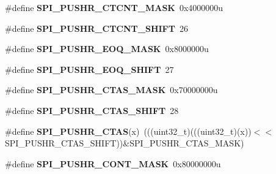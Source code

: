 \begin{DoxyCompactItemize}
\item 
\#define {\bfseries S\+P\+I\+\_\+\+P\+U\+S\+H\+R\+\_\+\+C\+T\+C\+N\+T\+\_\+\+M\+A\+SK}~0x4000000u\hypertarget{group__SPI__Register__Masks_gad9e8859d590a59f5e208f5f4a2c8b873}{}\label{group__SPI__Register__Masks_gad9e8859d590a59f5e208f5f4a2c8b873}

\item 
\#define {\bfseries S\+P\+I\+\_\+\+P\+U\+S\+H\+R\+\_\+\+C\+T\+C\+N\+T\+\_\+\+S\+H\+I\+FT}~26\hypertarget{group__SPI__Register__Masks_ga7db8f0d7ae83f27f34eafd5e4d993ed1}{}\label{group__SPI__Register__Masks_ga7db8f0d7ae83f27f34eafd5e4d993ed1}

\item 
\#define {\bfseries S\+P\+I\+\_\+\+P\+U\+S\+H\+R\+\_\+\+E\+O\+Q\+\_\+\+M\+A\+SK}~0x8000000u\hypertarget{group__SPI__Register__Masks_ga997edfebb20bfe6a385f018eb9a8a8fb}{}\label{group__SPI__Register__Masks_ga997edfebb20bfe6a385f018eb9a8a8fb}

\item 
\#define {\bfseries S\+P\+I\+\_\+\+P\+U\+S\+H\+R\+\_\+\+E\+O\+Q\+\_\+\+S\+H\+I\+FT}~27\hypertarget{group__SPI__Register__Masks_ga81e193cbd4602af43cd59a35e56fa958}{}\label{group__SPI__Register__Masks_ga81e193cbd4602af43cd59a35e56fa958}

\item 
\#define {\bfseries S\+P\+I\+\_\+\+P\+U\+S\+H\+R\+\_\+\+C\+T\+A\+S\+\_\+\+M\+A\+SK}~0x70000000u\hypertarget{group__SPI__Register__Masks_ga3ac8018fdfe57c16da2782e99232ae45}{}\label{group__SPI__Register__Masks_ga3ac8018fdfe57c16da2782e99232ae45}

\item 
\#define {\bfseries S\+P\+I\+\_\+\+P\+U\+S\+H\+R\+\_\+\+C\+T\+A\+S\+\_\+\+S\+H\+I\+FT}~28\hypertarget{group__SPI__Register__Masks_ga16a0810e65793ba9f24a5ae8be8cf49a}{}\label{group__SPI__Register__Masks_ga16a0810e65793ba9f24a5ae8be8cf49a}

\item 
\#define {\bfseries S\+P\+I\+\_\+\+P\+U\+S\+H\+R\+\_\+\+C\+T\+AS}(x)~(((uint32\+\_\+t)(((uint32\+\_\+t)(x))$<$$<$S\+P\+I\+\_\+\+P\+U\+S\+H\+R\+\_\+\+C\+T\+A\+S\+\_\+\+S\+H\+I\+FT))\&S\+P\+I\+\_\+\+P\+U\+S\+H\+R\+\_\+\+C\+T\+A\+S\+\_\+\+M\+A\+SK)\hypertarget{group__SPI__Register__Masks_gadc43fdbca4e34579e7ede4ac104c7ae5}{}\label{group__SPI__Register__Masks_gadc43fdbca4e34579e7ede4ac104c7ae5}

\item 
\#define {\bfseries S\+P\+I\+\_\+\+P\+U\+S\+H\+R\+\_\+\+C\+O\+N\+T\+\_\+\+M\+A\+SK}~0x80000000u\hypertarget{group__SPI__Register__Masks_gac28b0accd475a1a991ccece8d1333ae0}{}\label{group__SPI__Register__Masks_gac28b0accd475a1a991ccece8d1333ae0}


\end{DoxyCompactItemize}
